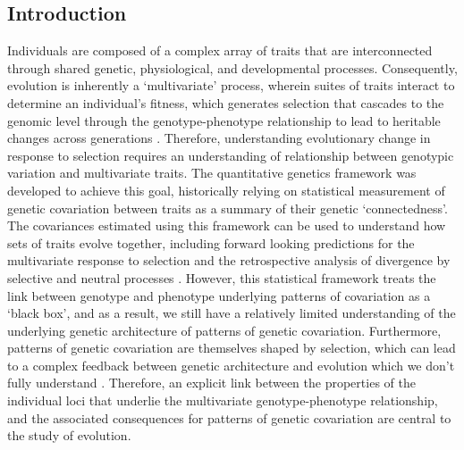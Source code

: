 \begin{refsection}

\section{Introduction}

Individuals are composed of a complex array of traits that are
interconnected through shared genetic, physiological, and developmental
processes. Consequently, evolution is inherently a `multivariate'
process, wherein suites of traits interact to determine an individual's
fitness, which generates selection that cascades to the genomic level
through the genotype-phenotype relationship to lead to heritable changes
across generations \parencite{Lande1983-ez,Klingenberg2008-ll,Melo2016-yw}.
Therefore, understanding evolutionary change in response to selection requires an understanding
of relationship between genotypic variation and multivariate traits. The
quantitative genetics framework was developed to achieve this goal,
historically relying on statistical measurement of genetic covariation
between traits as a summary of their genetic `connectedness'. The
covariances estimated using this framework can be used to understand how
sets of traits evolve together, including forward looking predictions
for the multivariate response to selection \parencite{Lande1979-by} and the
retrospective analysis of divergence by selective and neutral processes
\parencite{Felsenstein1988-ql}. However,
this statistical framework treats the link between genotype and
phenotype underlying patterns of covariation as a `black box', and as a
result, we still have a relatively limited understanding of the
underlying genetic architecture of patterns of genetic covariation.
Furthermore, patterns of genetic covariation are themselves shaped by
selection, which can lead to a complex feedback between genetic
architecture and evolution which we don't fully understand
\parencite{Turelli1994-pg,Jones2004-be,Jones2014-wj}. Therefore, an explicit
link between the properties of the individual loci that underlie the
multivariate genotype-phenotype relationship, and the associated
consequences for patterns of genetic covariation are central to the
study of evolution.


\end{refsection}
